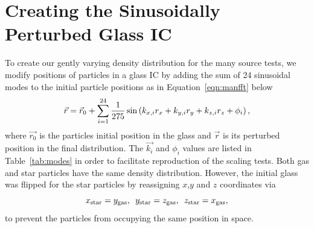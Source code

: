 \documentclass[fleq,usenatbib]{mnras}
\begin{document}
{\section{Creating the Sinusoidally Perturbed Glass IC}
\label{sec:icnd}
To create our gently varying density distribution for the many source tests, 
we modify positions of particles in a glass IC by adding the 
sum of 24 sinusoidal modes to the initial particle positions as in 
Equation~\ref{eqn:manfft} below
\begin{equation}\label{eqn:manfft}
\vec{r} = \vec{r}_{\rm 0} + \sum_{i=1}^{24} \frac{1}{275} \sin 
\left( k_{x,i} r_x + k_{y,i} r_y + k_{z,i} r_z + \phi_i\right),
\end{equation}
where $\vec{r_0}$ is the particles initial position in the glass and $\vec{r}$ 
is its perturbed position in the final distribution. The $\vec{k_i}$ and 
$\phi_i$ values are listed in Table~\ref{tab:modes} in order to facilitate 
reproduction of the scaling tests. Both gas and star particles have the same 
density distribution. However, the initial glass was flipped for the star 
particles by reassigning $x$,$y$ and $z$ coordinates via
 \begin{equation}
 x_{\rm star} = y_{\rm gas}, \hspace{5pt} y_{\rm star} = z_{\rm gas}, 
 \hspace{5pt} z_{\rm star} = x_{\rm gas},
 \end{equation}
to prevent the particles from occupying the same position in space.

}
\end{document}
